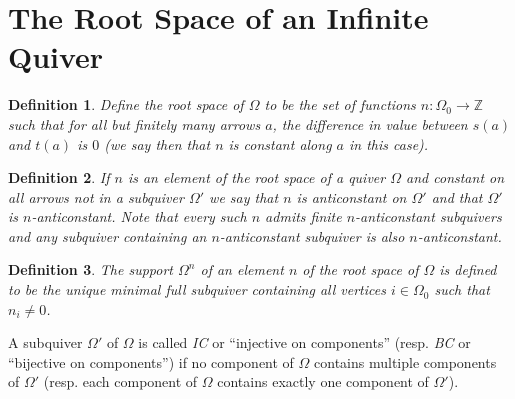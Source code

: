 \documentclass{article}
\newtheorem{definition}{Definition}
\begin{document}




  

\section{The Root Space of an Infinite Quiver}
\label{sec: roots}





\begin{definition}
    Define the \emph{root space} of $\Omega$ to be the set of functions $n : \Omega_0 \to \mathbb{Z}$ such that for all but finitely many arrows $a$, the difference in value between $s(a)$ and $t(a)$ is $0$ (we say then that $n$ is constant along $a$ in this case). 
  \end{definition}
  

\begin{definition}
  If $n$ is an element of the root space of a quiver $\Omega$ and constant on all arrows not in a subquiver $\Omega'$ we say that $n$ is \emph{anticonstant} on $\Omega'$ and that $\Omega'$ is $n$-anticonstant. Note that every such $n$ admits finite $n$-anticonstant subquivers and any subquiver containing an $n$-anticonstant subquiver is also $n$-anticonstant.
\end{definition}


\begin{definition}
The \emph{support} $\Omega^n$ of an element $n$ of the root space of $\Omega$ is defined to be the unique minimal full subquiver containing all vertices $i \in \Omega_0$ such that $n_i \neq 0$. 
\end{definition}


A subquiver $\Omega'$ of $\Omega$ is called \emph{IC} or ``injective on components''
(resp. \emph{BC} or ``bijective on components'') if no component of $\Omega$ contains multiple components of  $\Omega'$  (resp.  each component of $\Omega$ contains exactly  one component of $\Omega'$). 
\end{document}
